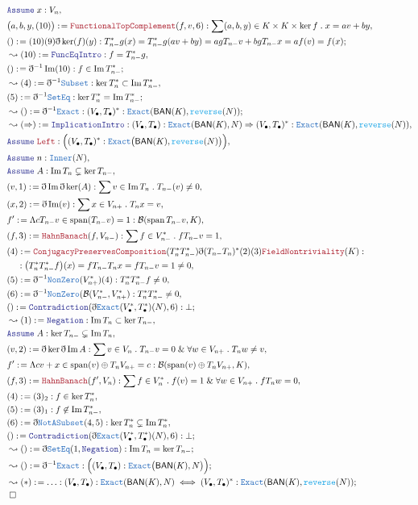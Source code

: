 \documentclass[12pt]{scrartcl}
\newcommand{\TYPE}[1]{\textcolor{NavyBlue}{\mathtt{#1}}}
\newcommand{\FUNC}[1]{\textcolor{Cerulean}{\mathtt{#1}}}
\newcommand{\LOGIC}[1]{\textcolor{Blue}{\mathtt{#1}}}
\newcommand{\THM}[1]{\textcolor{Maroon}{\mathtt{#1}}}
\renewcommand{\.}{\; . \;}
\newcommand{\de}{: \kern 0.1pc =}
\newcommand{\NewLine}{\\ & \kern 1pc}
\newcommand{\Page}[1]{\begin{align*} #1 \end{align*} \newpage   }
\newcommand{ \bd }{ \ByDef }
\renewcommand{\And}{\; \& \;}
\DeclareMathOperator*{\im}{Im}
\newcommand{\Say}[3]{& #1 \de #2 : #3, \\}
\newcommand{\Conclude}[3]{& #1 \de #2 : #3; \\}
\newcommand{\Derive}[3]{& \leadsto #1 \de #2 : #3, \\}
\newcommand{\DeriveConclude}[3]{& \leadsto #1 \de #2 : #3 ; \\}
\newcommand{\A}{\LOGIC{Assume} \;}
\newcommand{\Assume}[2]{& \A #1 : #2, \\}
\newcommand{\QED}{\; \square}
\newcommand{\EndProof}{& \QED \\}
\newcommand{\ByDef}{\eth}
\DeclareMathOperator{\Span}{span}
\newcommand{\BAN}{\textsf{BAN}}
\newcommand{\B}{\mathcal{B}}
\begin{document}
\Page{
\Assume{x}{V_n}
\Say{\big(a,b,y,(10)\big)}{\THM{FunctionalTopComplement}(f,v,6)}{\sum (a,b,y) \in K \times K \times \ker f \. x = av + by}
\Conclude{()}{(10)(9)\bd \ker(f)(y)}{ T^*_{n-}g(x) = T^*_{n-}g(av + by) = agT_{n-}v  + bgT_{n-}x = a f(v) = f(x) }
\Derive{(10)}{\LOGIC{FuncEqIntro}}{f = T_{n-}^* g}
\Conclude{()}{\bd^{-1} \im (10)}{f \in \im T^*_{n-}}
\Derive{(4)}{\bd^{-1} \TYPE{Subset}}{ \ker T^*_{n} \subset \im T^*_{n-} }
\Conclude{(5)}{\bd^{-1} \TYPE{SetEq}}{ \ker T^*_{n} = \im T^*_{n-}}
\DeriveConclude{()}{\bd^{-1}\TYPE{Exact}}{(V_{\bullet},T_{\bullet})^* : \TYPE{Exact}(\BAN(K),\FUNC{reverse}(N))}
\Derive{(\Rightarrow)}{\LOGIC{ImplicationIntro}}{
(V_{\bullet},T_{\bullet}) : \TYPE{Exact}(\BAN(K),N)
\Rightarrow
(V_{\bullet},T_{\bullet})^* : \TYPE{Exact}(\BAN(K),\FUNC{reverse}(N))}
\Assume{\THM{Left}}{\Big( (V_{\bullet},T_{\bullet})^* : \TYPE{Exact}\big(\BAN(K),\FUNC{reverse}(N)\big) \Big)}
\Assume{n}{\TYPE{Inner}(N)}
\Assume{A}{ \im T_n \subsetneq \ker T_{n-} }
\Say{(v,1)}{\bd \im \bd \ker (A) }{\sum v \in \im T_n \. T_{n-}(v) \neq 0 }
\Say{(x,2)}{ \bd \im (v) }{ \sum x \in V_{n+} \. T_{n} x = v  }
\Say{f'}{ \Lambda cT_{n-}v \in \Span(T_{n-}v) = 1  }{\B(\Span{T_{n-}}v,K)}
\Say{(f,3)}{\THM{HahnBanach}(f,V_{n-})}{\sum f \in V_{n-}^* \. f T_{n-}v = 1}
\Say{(4)}{ \THM{ConjugacyPreservesComposition}(T^*_{n} T^*_{n-})\bd (T_{n-}T_n)^*(2)(3)\THM{FieldNontriviality}(K) }
{ 
\NewLine :
\big( T^*_{n} T^*_{n-} f \big) (x) = f T_{n-} T_{n} x = f T_{n-} v = 1 \neq 0}
\Say{(5)}{\bd^{-1}\TYPE{NonZero}(V^*_{n+})(4)}{  T^*_{n} T^*_{n-} f \neq 0  }
\Say{(6)}{\bd^{-1}\TYPE{NonZero}(\B(V^*_{n-},V^*_{n+})}{ T^*_{n} T^*_{n-} \neq 0}
\Conclude{()}{\LOGIC{Contradiction}(\bd \TYPE{Exact}(V^*_{\bullet},T^*_{\bullet})(N),6)}{\bot}
\Derive{(1)}{\LOGIC{Negation}}{\im T_n \subset \ker T_{n-} }
\Assume{A}{\ker T_{n-} \subsetneq \im T_n}
\Say{(v,2)}{\bd \ker \bd \im A}{\sum v \in  V_n \. T_{n-}v =0 \And \forall w \in V_{n+} \. 
 T_n w \neq v
 }
\Say{f'}{ \Lambda cv + x \in \Span(v) \oplus T_{n} V_{n+} =  c }{ \B(\Span(v) \oplus T_{n} V_{n+},K)}
\Say{(f,3)}{\THM{HahnBanach}(f',V_n)}{\sum f \in V^*_{n} \.  f(v) = 1 \And \forall w \in V_{n+} \. 
  fT_{n}w = 0 
   }
\Say{(4)}{ (3)_2}{ f \in \ker T^*_n}
\Say{(5)}{(3)_1}{f \not \in \im T^*_{n-}}
\Say{(6)}{\bd \TYPE{NotASubset} (4,5)}{ \ker T^*_n \subsetneq \im T^*_n  }
\Conclude{()}{\LOGIC{Contradiction}(\bd \TYPE{Exact}(V^*_{\bullet},T^*_{\bullet})(N),6)}{\bot}
\DeriveConclude{()}{ \bd \TYPE{SetEq}(1, \LOGIC{Negation})}{\im T_n = \ker T_{n-}}
\DeriveConclude{()}{\bd^{-1} \TYPE{Exact}}{\Big(  (V_{\bullet},T_{\bullet}) : \TYPE{Exact}\big(\BAN(K),N \big)   \Big)}
\DeriveConclude{(*)}{\ldots}{ (V_{\bullet},T_{\bullet}) : \TYPE{Exact}(\BAN(K),N) \iff (V_{\bullet},T_{\bullet})^* : \TYPE{Exact}(\BAN(K),\FUNC{reverse}(N))}
\EndProof
}
\end{document}

